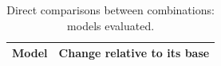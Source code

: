 \begin{table}[htbp]
\centering
\caption{Direct comparisons between combinations: models evaluated.}
\begin{tabular}{l p{}}
\toprule
Model & Change relative to its base \\
\midrule
\bottomrule
\end{tabular}
\label{tab:mi_improvements_selection_variants}
\end{table}
